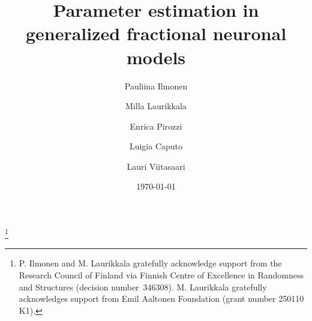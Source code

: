 \documentclass[11pt,reqno,oneside, a4paper]{amsart}
\numberwithin{equation}{section}
\theoremstyle{remark}
\begin{document}
\title[Parameter estimation in  generalized fractional  neuronal models]{Parameter estimation in  generalized fractional  neuronal models}



\author[Ilmonen]{Pauliina Ilmonen}
\address{Aalto University School of Science, Department of Mathematics and Systems Analysis, PO Box 11100, 00076 Aalto, Finland}

\author[Laurikkala]{Milla Laurikkala}
\address{Aalto University School of Science, Department of Mathematics and Systems Analysis, PO Box 11100, 00076 Aalto, Finland}

\author[Pirozzi]{Enrica Pirozzi}
\address{Department of Mathematics and Physics, University of Campania Luigi Vanvitelli, Caserta, 81100, Italy}



\author[Caputo]{Luigia Caputo}
\address{Department of Mathematics and Applications, University of Naples Federico II, Naples, 80126, Italy}

\author[Viitasaari]{Lauri Viitasaari}
\address{Aalto University School of Business, Department of Information and Service Management, PO Box 21210, 00076 Aalto, Finland}


\date{\today}

\thanks{
P. Ilmonen and M. Laurikkala gratefully acknowledge support from the Research Council of Finland via Finnish Centre of Excellence in Randomness
and Structures 
(decision number~346308). M. Laurikkala gratefully acknowledges support from Emil Aaltonen Foundation (grant number 250110 K1).}
\end{document}
